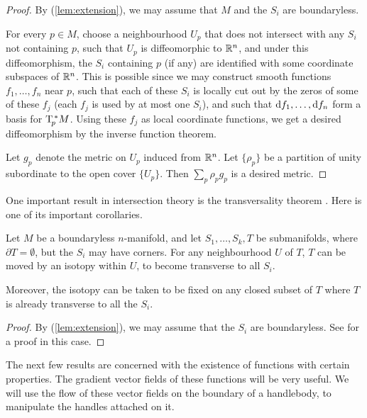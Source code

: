 \begin{proof}
By (\ref{lem:extension}), we may assume that
$M$ and the $S_i$ are boundaryless.

For every $p\in M$, choose a neighbourhood $U_p$ that
does not intersect with any $S_i$ not containing $p$,
such that $U_p$ is diffeomorphic to $\mathbb{R}^n$, and under this diffeomorphism,
the $S_i$ containing $p$ (if any) are identified with some coordinate subspaces of $\mathbb{R}^n$.
This is possible since we may construct
smooth functions $f_1,\dotsc,f_n$ near $p$,
such that each of these $S_i$ is locally cut out by the zeros of some of these $f_j$
(each $f_j$ is used by at most one $S_i$),
and such that $\mathrm{d} f_1,\dotsc,\mathrm{d} f_n$ form a basis for $\mathrm{T}_{\!p}^{\,*}M$.
Using these $f_j$ as local coordinate functions,
we get a desired diffeomorphism by the inverse function theorem.

Let $g_p$ denote the metric on $U_p$ induced from $\mathbb{R}^n$.
Let $\{\rho_p\}$ be a partition of unity subordinate to the open cover $\{U_p\}$.
Then $\sum_p\rho_pg_p$ is a desired metric.
\end{proof}

One important result in intersection theory is the transversality theorem \cite[p.\,68]{gp}.
Here is one of its important corollaries.

\begin{lemma}\label{cor:transverse}
Let $M$ be a boundaryless $n$-manifold,
and let $S_1,\dotsc,S_k,T$ be submanifolds,
where $\partial T=\emptyset$, but the $S_i$ may have corners.
For any neighbourhood $U$ of $T$,
$T$ can be moved by an isotopy within $U$,
to become transverse to all $S_i$.

Moreover, the isotopy can be taken to be fixed on any closed subset of $T$
where $T$ is already transverse to all the $S_i$.
\end{lemma}

\begin{proof}
By (\ref{lem:extension}), we may assume that the $S_i$ are boundaryless.
See \cite[p.\,70]{gp} for a proof in this case.
\end{proof}

The next few results are concerned with the existence of
functions with certain properties.
The gradient vector fields of these functions will be very useful.
We will use the flow of these vector fields on the boundary of a handlebody,
to manipulate the handles attached on it.

